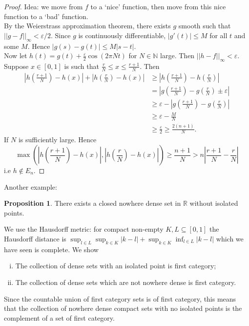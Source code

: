 \documentclass[a4paper, 10pt, twocolumn]{amsart}
\theoremstyle{definition}
\newtheorem*{proposition}{Proposition}
\newcommand{\bb}[1]{\mathbb{#1}}
\newcommand{\eps}[0]{\varepsilon}
\newcommand{\sbs}[0]{\subseteq}
\newcommand{\1}{\mathbbm{1}}
\begin{document}
\begin{proof}
    Idea: we move from $f$ to a `nice' function, then move from this nice function to a `bad' function.\\

    By the Weierstrass approximation theorem, there exists $g$ smooth such that $||g-f||_\infty<\eps/2$. Since $g$ is continuously differentiable, $|g'(t)| \le M$ for all $t$ and some $M$. Hence $|g(s)-g(t)|\le M|s-t|$. \\

    Now let $h(t) = g(t) +\frac{\eps}{2}\cos(2\pi Nt)$ for $N \in \bb{N}$ large. Then $||h-f||_\infty < \eps$. Suppose $x \in [0,1]$ is such that $\frac{r}{N} \le x \le \frac{r+1}{N}$. Then \begin{align*}
        \left|h\left(\frac{r+1}{N}\right) - h(x)\right| + \left|h\left(\frac{r}{N}\right)-h(x)\right| &\ge \left|h\left(\frac{r+1}{N}\right)-h\left(\frac{r}{N}\right)\right|\\
        &= \left|g\left(\frac{r+1}{N}\right)-g\left(\frac{r}{N}\right) \pm \eps\right|\\
        &\ge \eps -\left|g\left(\frac{r+1}{N}\right)-g\left(\frac{r}{N}\right)\right| \\
        &\ge \eps-\frac{M}{N}\\
        & \ge \frac{\eps}{2} \ge \frac{2(n+1)}{N}.
    \end{align*}
    If $N$ is sufficiently large. Hence \[\max\left(\left|h\left(\frac{r+1}{N}\right) - h(x)\right|, \left|h\left(\frac{r}{N}\right)-h(x)\right|\right) \ge \frac{n+1}{N}> n\left|\frac{r+1}{N}-\frac{r}{N}\right|\]
    i.e $h \not \in E_n$.
\end{proof}

Another example: 
\begin{proposition}
    There exists a closed nowhere dense set in $\bb{R}$ without isolated points.
\end{proposition}

We use the Hausdorff metric: for compact non-empty $K,L \sbs [0,1]$ the Hausdorff distance is $\sup_{l \in L} \sup_{k \in K} |k-l| + \sup_{k \in K} \inf_{l \in L} |k-l|$ which we have seen is complete. We show \begin{enumerate}[(i)]
    \item The collection of dense sets with an isolated point is first category;
    \item The collection of dense sets which are not nowhere dense is first category.
\end{enumerate}
Since the countable union of first category sets is of first category, this means that the collection of nowhere dense compact sets with no isolated points is the complement of a set of first category.\\
\end{document}
